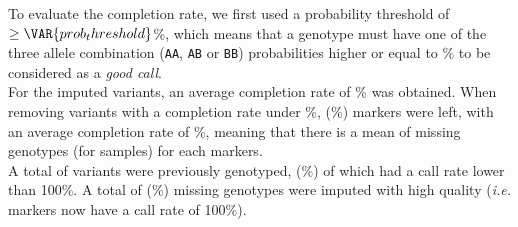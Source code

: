 
To evaluate the completion rate, we first used a probability threshold of
$\geq \VAR{ prob_threshold }$\%, which means that a genotype must have one of
the three allele combination (\texttt{AA}, \texttt{AB} or \texttt{BB})
probabilities higher or equal to \% to be considered as a
\textit{good call}.\\

For the  imputed variants, an average completion rate of
\% was obtained. When removing variants with a
completion rate under \%, 
(\%) markers were left, with an average completion rate
of \%, meaning that there is a mean of
 missing genotypes (for  samples) for
each markers.\\

A total of  variants were previously genotyped,
 (\%) of
which had  a call rate lower than 100\%. A total of
 (\%) missing
genotypes were imputed with high quality (\textit{i.e.}
 markers now have a call rate of 100\%).

